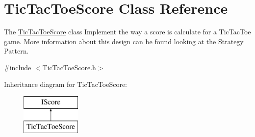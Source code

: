 \hypertarget{class_tic_tac_toe_score}{}\section{Tic\+Tac\+Toe\+Score Class Reference}
\label{class_tic_tac_toe_score}


The \hyperlink{class_tic_tac_toe_score}{Tic\+Tac\+Toe\+Score} class Implement the way a score is calculate for a Tic\+Tac\+Toe game. More information about this design can be found looking at the Strategy Pattern.  




{\ttfamily \#include $<$Tic\+Tac\+Toe\+Score.\+h$>$}

Inheritance diagram for Tic\+Tac\+Toe\+Score\+:\begin{figure}[H]
\begin{center}
\leavevmode
\includegraphics[height=2.000000cm]{class_tic_tac_toe_score}
\end{center}
\end{figure}
